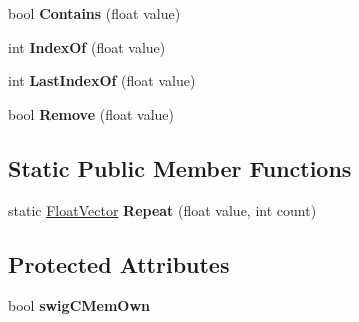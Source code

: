 \begin{DoxyCompactItemize}
\item 
\hypertarget{class_float_vector_a6d15161909d57264d53df571367a2218}{bool {\bfseries Contains} (float value)}\label{class_float_vector_a6d15161909d57264d53df571367a2218}

\item 
\hypertarget{class_float_vector_a653bf902c4d1060279195f431037155a}{int {\bfseries Index\+Of} (float value)}\label{class_float_vector_a653bf902c4d1060279195f431037155a}

\item 
\hypertarget{class_float_vector_a721939c751b324b0e3c0a00cd8fbfe66}{int {\bfseries Last\+Index\+Of} (float value)}\label{class_float_vector_a721939c751b324b0e3c0a00cd8fbfe66}

\item 
\hypertarget{class_float_vector_a8c0f2a92009e0a0a21d97ee0005b23a3}{bool {\bfseries Remove} (float value)}\label{class_float_vector_a8c0f2a92009e0a0a21d97ee0005b23a3}

\end{DoxyCompactItemize}
\subsection*{Static Public Member Functions}
\begin{DoxyCompactItemize}
\item 
\hypertarget{class_float_vector_a8679040772b1a10e9cc892fc2320e882}{static \hyperlink{class_float_vector}{Float\+Vector} {\bfseries Repeat} (float value, int count)}\label{class_float_vector_a8679040772b1a10e9cc892fc2320e882}

\end{DoxyCompactItemize}
\subsection*{Protected Attributes}
\begin{DoxyCompactItemize}
\item 
\hypertarget{class_float_vector_a2cf5b80eb25b0fecaafb6c8e05fd4d62}{bool {\bfseries swig\+C\+Mem\+Own}}\label{class_float_vector_a2cf5b80eb25b0fecaafb6c8e05fd4d62}

\end{DoxyCompactItemize}
